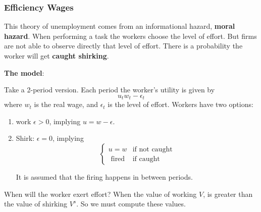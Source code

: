 \documentclass[11pt]{article}
\begin{document}
\subsubsection{Efficiency Wages}

This theory of unemployment comes from an informational hazard, \textbf{moral hazard}. When performing a task the workers choose the level of effort. But firms are not able to observe directly that level of effort. There is a probability the worker will get \textbf{caught shirking}.

\begin{shaded}
    \textbf{The model}:

    Take a 2-period version. Each period the worker's utility is given by
    \[u_t w_t - \epsilon_t\]
    where $w_t$ is the real wage, and $\epsilon_t$ is the level of effort. Workers have two options:

    \begin{enumerate}
        \item work $\epsilon>0$, implying $u = w - \epsilon$.

        \item Shirk: $\epsilon=0$, implying
        \begin{equation*}
            \left\{\begin{array}{cc}
            u = w & \text{if not caught} \\
            \text{ fired} & \text{if caught}
        \end{array} \right.
        \end{equation*}

        \begin{note}
            It is assumed that the firing happens in between periods.
        \end{note}
    \end{enumerate}
\end{shaded}

When will the worker exert effort? When the value of working $V$, is greater than the value of shirking $V^s$. So we must compute these values.
\end{document}
